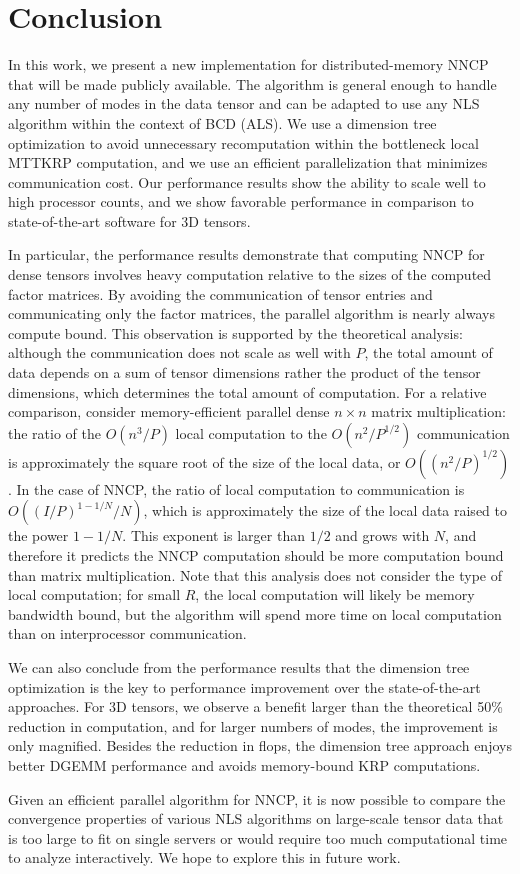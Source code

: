 
\section{Conclusion} \label{sec:conclusion}

In this work, we present a new implementation for distributed-memory NNCP that will be made publicly available.
The algorithm is general enough to handle any number of modes in the data tensor and can be adapted to use any NLS algorithm within the context of BCD (ALS).
We use a dimension tree optimization to avoid unnecessary recomputation within the bottleneck local MTTKRP computation, and we use an efficient parallelization that minimizes communication cost.
Our performance results show the ability to scale well to high processor counts, and we show favorable performance in comparison to state-of-the-art software for 3D tensors.

In particular, the performance results demonstrate that computing NNCP for dense tensors involves heavy computation relative to the sizes of the computed factor matrices.
By avoiding the communication of tensor entries and communicating only the factor matrices, the parallel algorithm is nearly always compute bound.
This observation is supported by the theoretical analysis: although the communication does not scale as well with $P$, the total amount of data depends on a sum of tensor dimensions rather the product of the tensor dimensions, which determines the total amount of computation.
For a relative comparison, consider memory-efficient parallel dense $n\times n$ matrix multiplication: the ratio of the $O(n^3/P)$ local computation to the $O(n^2/P^{1/2})$ communication is approximately the square root of the size of the local data, or $O((n^2/P)^{1/2})$.
In the case of NNCP, the ratio of local computation to communication is $O((I/P)^{1-1/N}/N)$, which is approximately the size of the local data raised to the power $1-1/N$.
This exponent is larger than $1/2$ and grows with $N$, and therefore it predicts the NNCP computation should be more computation bound than matrix multiplication.
Note that this analysis does not consider the type of local computation; for small $R$, the local computation will likely be memory bandwidth bound, but the algorithm will spend more time on local computation than on interprocessor communication.

We can also conclude from the performance results that the dimension tree optimization is the key to performance improvement over the state-of-the-art approaches.
For 3D tensors, we observe a benefit larger than the theoretical 50\% reduction in computation, and for larger numbers of modes, the improvement is only magnified.
Besides the reduction in flops, the dimension tree approach enjoys better DGEMM performance and avoids memory-bound KRP computations.

Given an efficient parallel algorithm for NNCP, it is now possible to compare the convergence properties of various NLS algorithms on large-scale tensor data that is too large to fit on single servers or would require too much computational time to analyze interactively.
We hope to explore this in future work.